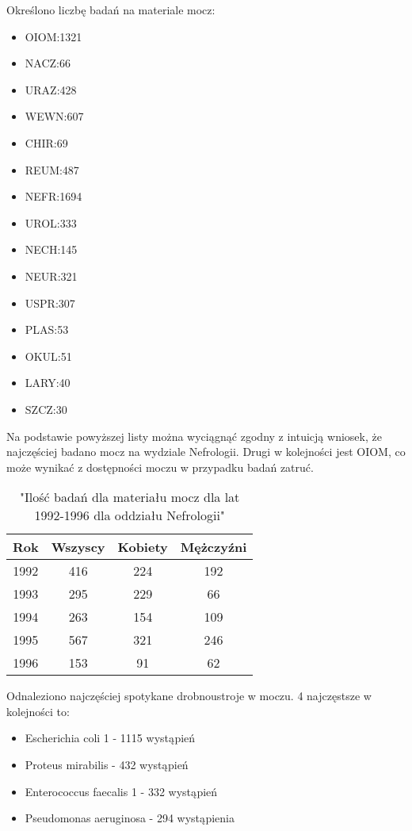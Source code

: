 \documentclass[a4paper,11pt]{article}
\begin{document}
Określono liczbę badań na materiale mocz:
\begin{itemize}
\item OIOM:1321
\item NACZ:66
\item URAZ:428
\item WEWN:607
\item CHIR:69
\item REUM:487
\item NEFR:1694
\item UROL:333
\item NECH:145
\item NEUR:321
\item USPR:307
\item PLAS:53
\item OKUL:51
\item LARY:40
\item SZCZ:30
\end{itemize}
Na podstawie powyższej listy można wyciągnąć zgodny z intuicją wniosek, że najczęściej badano mocz na wydziale Nefrologii. Drugi w kolejności jest OIOM, co może wynikać z dostępności moczu w przypadku badań zatruć.  

\begin{table}[H]
  \begin{center}
  \caption{"Ilość badań dla materiału mocz dla lat 1992-1996 dla oddziału Nefrologii"}
  \begin{tabular}{|c|c|c|c|}
    \hline
    Rok & Wszyscy & Kobiety & Mężczyźni \\ \hline
1992 &416 &224 &192\\ \hline
1993 &295 &229 &66\\ \hline
1994 &263 &154 &109\\ \hline
1995 &567 &321 &246\\ \hline
1996 &153 &91 &62\\ \hline
  \end{tabular}
\end{center}
\end{table}


Odnaleziono najczęściej spotykane drobnoustroje w moczu. 4 najczęstsze w kolejności to:
\begin{itemize}
\item Escherichia coli 1 - 1115 wystąpień
\item Proteus mirabilis - 432 wystąpień
\item Enterococcus faecalis 1 - 332 wystąpień
\item Pseudomonas aeruginosa - 294 wystąpienia
\end{itemize}
\end{document}
